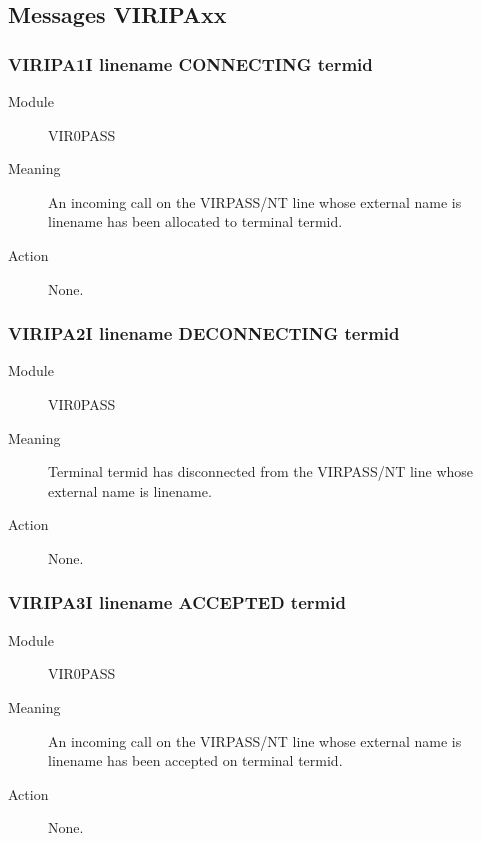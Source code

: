 \documentclass[letterpaper,10pt,english]{sphinxmanual}
\begin{document}
\subsection{Messages VIRIPAxx}
\label{\detokenize{messages:messages-viripaxx}}

\subsubsection{VIRIPA1I linename CONNECTING termid}
\label{\detokenize{messages:viripa1i-linename-connecting-termid}}\begin{description}
\item[{Module}] \leavevmode
VIR0PASS

\item[{Meaning}] \leavevmode
An incoming call on the VIRPASS/NT line whose external name is linename has been allocated to terminal termid.

\item[{Action}] \leavevmode
None.

\end{description}


\subsubsection{VIRIPA2I linename DECONNECTING termid}
\label{\detokenize{messages:viripa2i-linename-deconnecting-termid}}\begin{description}
\item[{Module}] \leavevmode
VIR0PASS

\item[{Meaning}] \leavevmode
Terminal termid has disconnected from the VIRPASS/NT line whose external name is linename.

\item[{Action}] \leavevmode
None.

\end{description}


\subsubsection{VIRIPA3I linename ACCEPTED termid}
\label{\detokenize{messages:viripa3i-linename-accepted-termid}}\begin{description}
\item[{Module}] \leavevmode
VIR0PASS

\item[{Meaning}] \leavevmode
An incoming call on the VIRPASS/NT line whose external name is linename has been accepted on terminal termid.

\item[{Action}] \leavevmode
None.

\end{description}
\end{document}
